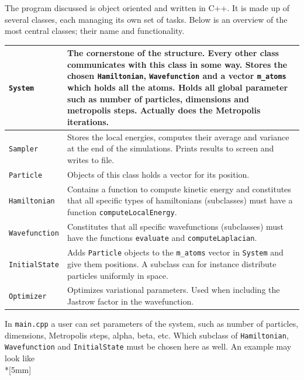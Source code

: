 \documentclass[english, a4paper]{article}
\begin{document}
The program discussed is object oriented and written in C++. It is made up of several classes, each managing its own set of tasks. 
Below is an overview of the most central classes; their name and functionality.
\renewcommand{\arraystretch}{1.8}
\begin{table}[H]
	\centering
	\begin{tabularx}{\textwidth}{ p{2.5cm}  p{14.5cm} }
		\hline
		\texttt{System}& The cornerstone of the structure. Every other class communicates with this class in some way. \newline
		Stores the chosen \texttt{Hamiltonian}, \texttt{Wavefunction} and  a vector \texttt{m\_atoms} which holds all the atoms. 
		Holds all global parameter such as number of particles, dimensions and metropolis steps. \newline
		Actually does the Metropolis iterations.\\*
		\hline
		\texttt{Sampler}& Stores the local energies, computes their average and variance at the end of the simulations.
		Prints results to screen and writes to file.\\*		
		\hline
		\texttt{Particle}& Objects of this class holds a vector for its position.\\*
		\hline
		\texttt{Hamiltonian}& Contains a function to compute kinetic energy and constitutes that all specific types of
		hamiltonians (subclasses) must have a function \texttt{computeLocalEnergy}.\\*  
		\hline
		\texttt{Wavefunction}& Constitutes that all specific wavefunctions (subclasses) must have the functions \texttt{evaluate} and
		\texttt{computeLaplacian}.\\*
		\hline
		\texttt{InitialState}& Adds \texttt{Particle} objects to the \texttt{m\_atoms} vector in \texttt{System} and give them positions.
		A subclass can for instance distribute particles uniformly in space.\\*
		\hline
		\texttt{Optimizer}& Optimizes variational parameters. Used when including the Jastrow factor in the wavefunction.\\*
		\hline
	\end{tabularx}
\end{table}
\renewcommand{\arraystretch}{1}
In \texttt{main.cpp} a user can set parameters of the system, such as number of particles, dimensions, Metropolis steps, alpha, beta, etc.
Which subclass of \texttt{Hamiltonian}, \texttt{Wavefunction} and \texttt{InitialState} must be chosen here as well. An example may look like \\*[5mm]
\end{document}
